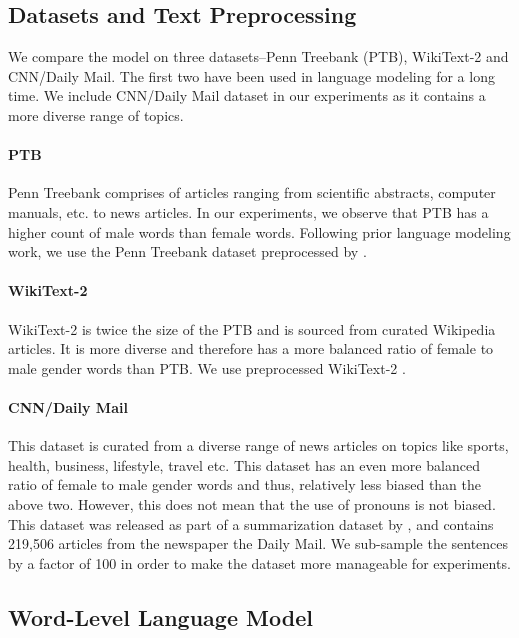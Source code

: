 \documentclass[11pt,a4paper]{article}
\begin{document}
\subsection{Datasets and Text Preprocessing}

We compare the model on three datasets--Penn Treebank (PTB), WikiText-2 and CNN/Daily Mail. The first two have been used in language modeling for a long time. We include CNN/Daily Mail dataset in our experiments as it contains a more diverse range of topics. 

\paragraph{PTB} Penn Treebank comprises of articles ranging from scientific abstracts, computer manuals, etc. to news articles. %
In our experiments, we observe that PTB has a higher count of male words than female words. Following prior language modeling work, we use the Penn Treebank dataset \citep[PTB;][]{DBLP:journals/coling/MarcusSM94} preprocessed by .

 \paragraph{WikiText-2} WikiText-2 is twice the size of the PTB and is sourced from curated Wikipedia articles. It is more diverse  and therefore has a more balanced ratio of female to male gender words than PTB.  We use preprocessed WikiText-2 \citep[Wikitext-2;][]{merity2016pointer}. 

\paragraph{CNN/Daily Mail} This dataset is curated from a diverse range of news articles on topics like sports, health, business, lifestyle, travel etc. This dataset has an even more balanced ratio of female to male gender words and thus, relatively less biased than the above two. However, this does not mean that the use of pronouns is not biased. This dataset was released as part of a summarization dataset by \citet{nips15_hermann}, and contains 219,506 articles from the newspaper the Daily Mail. We sub-sample the sentences by a factor of 100 in order to make the dataset more manageable for experiments. 


\subsection{Word-Level Language Model}
\end{document}
